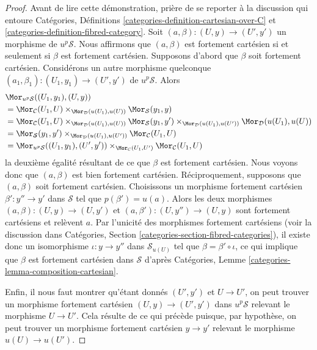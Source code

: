 \begin{proof}
Avant de lire cette démonstration, prière de se reporter à la discussion qui entoure
Catégories, Définitions \ref{categories-definition-cartesian-over-C} et
\ref{categories-definition-fibred-category}.
Soit $(a, \beta) : (U, y) \to (U', y')$ un morphisme de $u^p\mathcal{S}$.
Nous affirmons que $(a, \beta)$ est fortement cartésien si et seulement si
$\beta$ est fortement cartésien. Supposons d'abord que $\beta$ soit fortement cartésien.
Considérons un autre morphisme quelconque
$(a_1, \beta_1) : (U_1, y_1) \to (U', y')$ de $u^p\mathcal{S}$. Alors
\begin{align*}
& \Mor_{u^p\mathcal{S}}((U_1, y_1), (U, y)) \\
& =
\Mor_\mathcal{C}(U_1, U)
\times_{\Mor_\mathcal{D}(u(U_1), u(U))}
\Mor_\mathcal{S}(y_1, y) \\
& =
\Mor_\mathcal{C}(U_1, U)
\times_{\Mor_\mathcal{D}(u(U_1), u(U))}
\Mor_\mathcal{S}(y_1, y')
\times_{\Mor_\mathcal{D}(u(U_1), u(U'))}
\Mor_\mathcal{D}(u(U_1), u(U)) \\
& =
\Mor_\mathcal{S}(y_1, y')
\times_{\Mor_\mathcal{D}(u(U_1), u(U'))}
\Mor_\mathcal{C}(U_1, U) \\
& =
\Mor_{u^p\mathcal{S}}((U_1, y_1), (U', y'))
\times_{\Mor_\mathcal{C}(U_1, U')}
\Mor_\mathcal{C}(U_1, U)
\end{align*}
la deuxième égalité résultant de ce que $\beta$ est fortement cartésien. Nous voyons donc
que $(a, \beta)$ est bien fortement cartésien. Réciproquement, supposons que
$(a, \beta)$ soit fortement cartésien. Choisissons un morphisme fortement cartésien
$\beta' : y'' \to y'$ dans $\mathcal{S}$ tel que $p(\beta') = u(a)$.
Alors les deux morphismes $(a, \beta) : (U, y) \to (U, y')$ et
$(a, \beta') : (U, y'') \to (U, y)$ sont fortement cartésiens et
relèvent $a$. Par l'unicité des morphismes fortement cartésiens
(voir la discussion dans
Catégories, Section \ref{categories-section-fibred-categories}),
il existe donc un isomorphisme $\iota : y \to y''$ dans $\mathcal{S}_{u(U)}$
tel que $\beta = \beta' \circ \iota$, ce qui implique que
$\beta$ est fortement cartésien dans $\mathcal{S}$ d'après
Catégories, Lemme \ref{categories-lemma-composition-cartesian}.

\medskip\noindent
Enfin, il nous faut montrer
qu'étant donnés $(U', y')$ et $U \to U'$, on peut trouver un morphisme
fortement cartésien $(U, y) \to (U', y')$ dans $u^p\mathcal{S}$
relevant le morphisme $U \to U'$. Cela résulte de ce qui précède puisque, par hypothèse,
on peut trouver un morphisme fortement cartésien $y \to y'$ relevant le
morphisme $u(U) \to u(U')$.
\end{proof}

